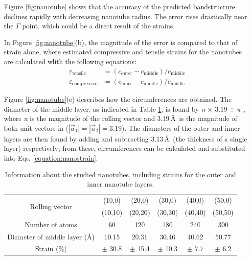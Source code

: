 \documentclass[11pt,a4paper,twoside]{report}  %
\numberwithin{equation}{section}					%
\numberwithin{figure}{section}						%
\begin{document}
Figure \ref{fig:nanotube} shows that the accuracy of the predicted bandstructure declines rapidly with decreasing nanotube radius. The error rises drastically near the $\Gamma$ point, which could be a direct result of the strains. 

In Figure \ref{fig:nanotube}(b), the magnitude of the error is compared to that of strain alone, where estimated compressive and tensile strains for the nanotubes are calculated wlith the following equations: \begin{align}\varepsilon_{\text{tensile}} &= (c_{\text{outer}}-c_{\text{middle}})/c_{\text{middle}}\\\varepsilon_{\text{compressive}} &= (c_{\text{inner}}-c_{\text{middle}})/c_{\text{middle}}\end{align}\label{equation:nanostrain}

Figure \ref{fig:nanotube}(e) describes how the circumferences are obtained. The diameter of the middle layer, as indicated in Table \ref{tab:nanostrains}, is found by \textit{n} $\times$ 3.19 $\div$ $\pi$ , where \textit{n} is the magnitude of the rolling vector and 3.19\,\AA\ is the magnitude of both unit vectors in  ($|\vec a_1|=|\vec a_2| = 3.19$). The diameters of the outer and inner layers are then found by adding and subtracting 3.13\,\AA\ (the thickness of a single  layer) respectively; from these, circumferences can be calculated and substituted into Eqs. \ref{equation:nanostrain}. 

\begin{table}
    \caption{Information about the studied nanotubes, including strains for the outer and inner nanotube layers.}
    \centering
    \begin{tabular}{cccccc}   
        \toprule      
       \multirow{2}{*}{Rolling vector} & (10,0) & (20,0) & (30,0) & (40,0) & (50,0) \\ 
       & (10,10) & (20,20) & (30,30) & (40,40) & (50,50) \\
        \midrule               
        Number of atoms & 60 & 120 & 180 & 240 & 300 \\
         Diameter of middle layer (\AA)  & 10.15 & 20.31 & 30.46 & 40.62   & 50.77   \\   
        Strain (\%) & $\pm$ 30.8 & $\pm$ 15.4 & $\pm$ 10.3 & $\pm$ 7.7  & $\pm$ 6.2    \\ 
        \bottomrule    
    \end{tabular}
    \label{tab:nanostrains}         %
\end{table}
\end{document}
